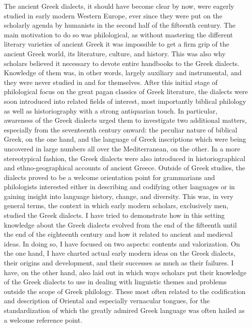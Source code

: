 \documentclass[12pt]{article}
\makeatletter
\renewcommand\section{\@startsection{section}{1}{0.0in}{0.1665in}{0.0835in}{\normalfont\normalsize\fontsize{14pt}{16.8pt}\selectfont\rmfamily\bfseries}}
\newenvironment{styleStandard}{\renewcommand\baselinestretch{1.25}\setlength\leftskip{0in}\setlength\rightskip{0in}\setlength\parindent{0.1972in}\setlength\parfillskip{0pt plus 1fil}\setlength\parskip{0in plus 1pt}\writerlistparindent\writerlistleftskip\leavevmode\normalfont\normalsize\writerlistlabel\ignorespaces}{\unskip\vspace{0in plus 1pt}\par}
\newcommand\writerlistleftskip{}
\newcommand\writerlistparindent{}
\newcommand\writerlistlabel{}
\makeatother
\begin{document}
\clearpage\section{9 Conclusion}
\hypertarget{Toc19704869}{}\begin{styleStandard}
The ancient Greek dialects, it should have become clear by now, were eagerly studied in early modern Western Europe, ever since they were put on the scholarly agenda by humanists in the second half of the fifteenth century. The main motivation to do so was philological, as without mastering the different literary varieties of ancient Greek it was impossible to get a firm grip of the ancient Greek world, its literature, culture, and history. This was also why scholars believed it necessary to devote entire handbooks to the Greek dialects. Knowledge of them was, in other words, largely auxiliary and instrumental, and they were never studied in and for themselves. After this initial stage of philological focus on the great pagan classics of Greek literature, the dialects were soon introduced into related fields of interest, most importantly biblical philology as well as historiography with a strong antiquarian touch. In particular, awareness of the Greek dialects urged them to investigate two additional matters, especially from the seventeenth century onward: the peculiar nature of biblical Greek, on the one hand, and the language of Greek inscriptions which were being uncovered in large numbers all over the Mediterranean, on the other. In a more stereotypical fashion, the Greek dialects were also introduced in historiographical and ethno-geographical accounts of ancient Greece. Outside of Greek studies, the dialects proved to be a welcome orientation point for grammarians and philologists interested either in describing and codifying other languages or in gaining insight into language history, change, and diversity. This was, in very general terms, the context in which early modern scholars, exclusively men, studied the Greek dialects. I have tried to demonstrate how in this setting knowledge about the Greek dialects evolved from the end of the fifteenth until the end of the eighteenth century and how it related to ancient and medieval ideas. In doing so, I have focused on two aspects: contents and valorization. On the one hand, I have charted actual early modern ideas on the Greek dialects, their origins and development, and their successes as much as their failures. I have, on the other hand, also laid out in which ways scholars put their knowledge of the Greek dialects to use in dealing with linguistic themes and problems outside the scope of Greek philology. These most often related to the codification and description of Oriental and especially vernacular tongues, for the standardization of which the greatly admired Greek language was often hailed as a welcome reference point.
\end{styleStandard}
\end{document}
